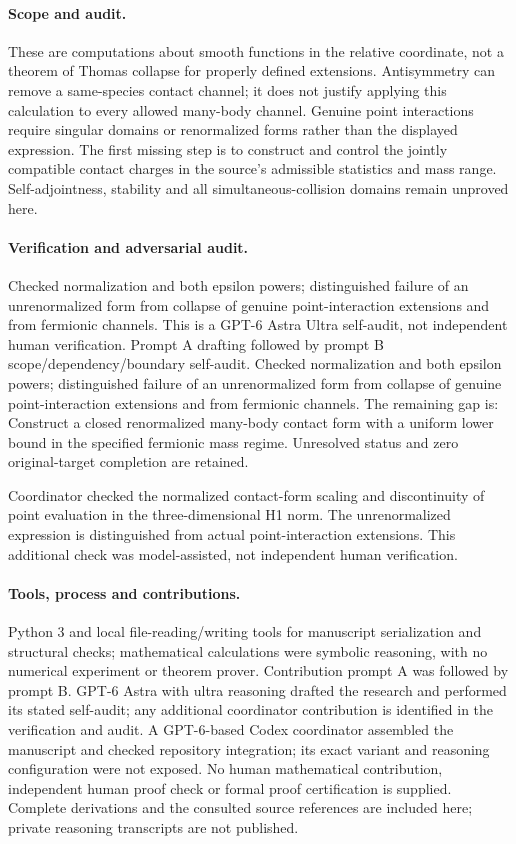 \documentclass[11pt]{article}
\begin{document}
\paragraph{Scope and audit.} These are computations about smooth functions in the relative coordinate, not a theorem of Thomas collapse for properly defined extensions. Antisymmetry can remove a same-species contact channel; it does not justify applying this calculation to every allowed many-body channel. Genuine point interactions require singular domains or renormalized forms rather than the displayed expression. The first missing step is to construct and control the jointly compatible contact charges in the source's admissible statistics and mass range. Self-adjointness, stability and all simultaneous-collision domains remain unproved here.

\paragraph{Verification and adversarial audit.}
Checked normalization and both epsilon powers; distinguished failure of an unrenormalized form from collapse of genuine point-interaction extensions and from fermionic channels. This is a GPT-6 Astra Ultra self-audit, not independent human verification. Prompt A drafting followed by prompt B scope/dependency/boundary self-audit. Checked normalization and both epsilon powers; distinguished failure of an unrenormalized form from collapse of genuine point-interaction extensions and from fermionic channels. The remaining gap is: Construct a closed renormalized many-body contact form with a uniform lower bound in the specified fermionic mass regime. Unresolved status and zero original-target completion are retained.

Coordinator checked the normalized contact-form scaling and discontinuity of point evaluation in the three-dimensional H1 norm. The unrenormalized expression is distinguished from actual point-interaction extensions. This additional check was model-assisted, not independent human verification.

\paragraph{Tools, process and contributions.}
Python 3 and local file-reading/writing tools for manuscript serialization and structural checks; mathematical calculations were symbolic reasoning, with no numerical experiment or theorem prover. Contribution prompt A was followed by prompt B. GPT-6 Astra with ultra reasoning drafted the research and performed its stated self-audit; any additional coordinator contribution is identified in the verification and audit. A GPT-6-based Codex coordinator assembled the manuscript and checked repository integration; its exact variant and reasoning configuration were not exposed. No human mathematical contribution, independent human proof check or formal proof certification is supplied. Complete derivations and the consulted source references are included here; private reasoning transcripts are not published.
\end{document}
